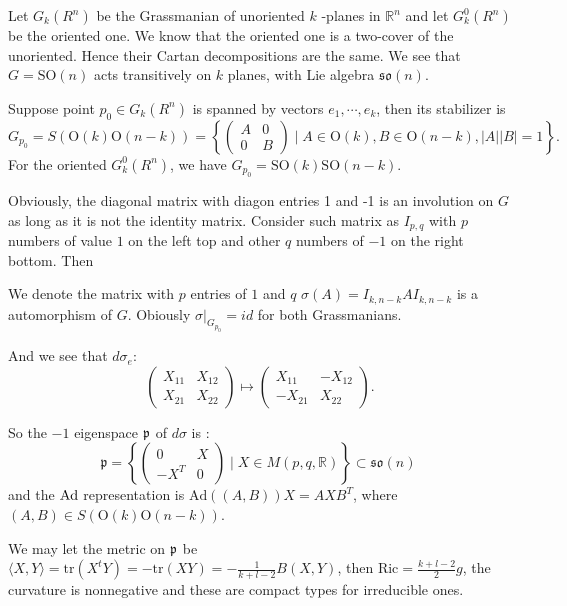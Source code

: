 	Let $G_{k}\left(R^{n}\right)$ be the Grassmanian of
	unoriented $k$ -planes in $\mathbb{R}^{n}$ and let
	$G_{k}^{0}\left(R^{n}\right)$ be the  oriented one. We know
	that the oriented one is a two-cover of the unoriented. Hence
	their Cartan decompositions are the same. We see that
	$G=\mathrm{SO}(n)$  acts transitively on $k$ planes, with Lie
	algebra $\mathfrak{so}(n)$. 
	
	Suppose point $p_{0}\in G_{k}\left(R^{n}\right)$ is spanned
	by vectors $e_{1}, \cdots, e_{k}$, then its stabilizer is
	\[
	G_{p_{0}}=S(\mathrm{O}(k)
	\mathrm{O}(n-k))=\left\{\left(\begin{array}{cc}
		A & 0 \\
		0 & B
	\end{array}\right) \mid A \in \mathrm{O}(k), B \in
	\mathrm{O}(n-k),|A||B|=1\right\}.
	\]
	For the oriented $G_{k}^{0}\left(R^{n}\right)$, we have
	$G_{p_{0}}=\mathrm{SO}(k) \mathrm{SO}(n-k)$.
	
	Obviously, the diagonal matrix with diagon entries 1 and -1
	is an involution on $G$ as long as it is not the identity
	matrix. Consider such matrix as $I_{p,q}$ with $p$ numbers of
	value $1$ on the left top and other $q$ numbers of $-1$ on the right bottom. Then 
	
	We denote the matrix with $p$ entries of $1$ and $q$
	$\sigma(A)=I_{k, n-k} A I_{k, n-k}$ is a automorphism of $G$.
	Obiously $\sigma|_{G_{p_0}}=id$ for both Grassmanians.

	And we see that $d\sigma_e$:
	\[
	\begin{pmatrix}
		X_{11}&X_{12}\\
		X_{21}&X_{22}
	\end{pmatrix}\mapsto
	\begin{pmatrix}
		X_{11}&-X_{12}\\
		-X_{21}&X_{22}
	\end{pmatrix}.
	\]
	
	
	So the $-1$ eigenspace ${\mathfrak p}$ of $d \sigma$ 
	is :
	\[
	\mathfrak{p}=\left\{\left(\begin{array}{cc}
		0 & X \\
		-X^{T} & 0
	\end{array}\right) \mid X \in M(p, q, \mathbb{R})\right\}
	\subset\mathfrak{so}(n)\ 
	\]
	and the $\mathrm{Ad}$ representation is $\mathrm{Ad}((A, B)) X=A X B^{T}$, 
	where $(A, B) \in S(\mathrm{O}(k) \mathrm{O}(n-k))$.

	We may let the metric on ${\mathfrak p}$ be $\langle
	X,Y\rangle=\mathrm{tr}(X^tY)=-\mathrm{tr}(XY)=-\frac{1}{k+l-
	2}B(X,Y)$, then $\mathrm{Ric}=\frac{k+l-2}{2}g$, the
	curvature is nonnegative and these are compact types for
	irreducible ones.
	
